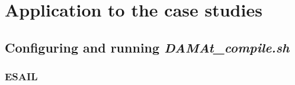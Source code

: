 \section{Application to the case studies}
\label{sec:case_studies}

%
%
%
%
%
%
%
%
%
%
%
%
%
%
%
%

\subsection{Configuring and running \emph{DAMAt\_compile.sh}}

\subsubsection{ESAIL}

